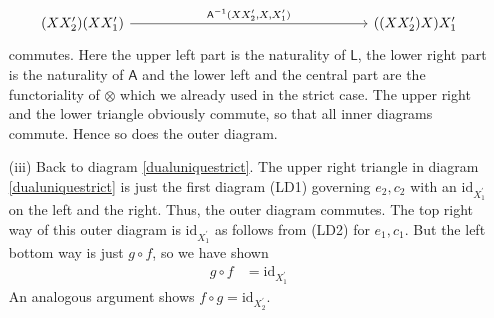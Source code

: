 \begin{prf}
\begin{enumerate}
\begin{equation*}
\begin{tikzcd}[row sep=4.2em,column sep=8.5em]
  \\
  (X X_{2}^{\prime}) (X X_{1}^{\prime})
  \ar{rr}{\mathsf{A}^{-1}(X X_{2}^{\prime},X,X_{1}^{\prime})}
  &
  &
  ((X X_{2}^{\prime}) X) X_{1}^{\prime}
\end{tikzcd}
\end{equation*}
commutes. Here the upper left part is the naturality of $\mathsf{L}$, the lower right part is the naturality of $\mathsf{A}$ and the lower left and the central part are the functoriality of $\otimes$ which we already used in the strict case. The upper right and the lower triangle obviously commute, so that all inner diagrams commute. Hence so does the outer diagram.

\item[(iii)]
Back to diagram \eqref{dualuniquestrict}. The upper right triangle in diagram \eqref{dualuniquestrict} is just the first diagram (LD1) governing $e_{2},c_{2}$ with an $\mathrm{id}_{X_{1}^{\prime}}$ on the left and the right. Thus, the outer diagram commutes. The top right way of this outer diagram is $\mathrm{id}_{X_{1}^{\prime}}$ as follows from (LD2) for $e_{1},c_{1}$. But the left bottom way is just $g \circ f$, so we have shown
\begin{align*}
  g
  \circ
  f
  &=
  \mathrm{id}_{X_{1}^{\prime}}
\end{align*}
An analogous argument shows $f \circ g = \mathrm{id}_{X_{2}^{\prime}}$.


\end{enumerate}
\end{prf}

